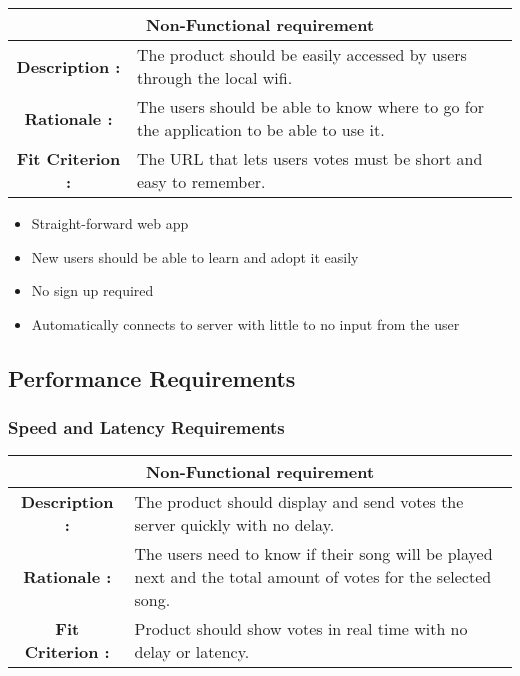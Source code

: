 \documentclass[12pt, titlepage]{article}
\begin{document}
\begin{center}
\begin{table}[H]
\begin{tabularx}{\textwidth}{| c X |}
\hline
\multicolumn{2}{|c|}{\textbf{Non-Functional requirement}}\\
\hline
\textbf{Description : } & The product should be easily accessed by users through the local wifi.\\
\hline
\textbf{Rationale : } & The users should be able to know where to go for the application to be able to use it.\\
\hline
\textbf{Fit Criterion : } & The URL that lets users votes must be short and easy to remember.\\
\hline
\end{tabularx}
\end{table}
\end{center}

\begin{itemize}
\item Straight-forward web app
\item New users should be able to learn and adopt it easily
\item No sign up required
\item Automatically connects to server with little to no input from the user
\end{itemize}

\subsection{Performance Requirements}
\subsubsection{Speed and Latency Requirements}

\begin{center}
\begin{table}[H]
\begin{tabularx}{\textwidth}{| c X |}
\hline
\multicolumn{2}{|c|}{\textbf{Non-Functional requirement}}\\
\hline
\textbf{Description : } &The product should display and send votes the server quickly with no delay.\\
\hline
\textbf{Rationale : } & The users need to know if their song will be played next and the total amount of votes for the selected song.\\
\hline
\textbf{Fit Criterion : } & Product should show votes in real time with no delay or latency.\\
\hline
\end{tabularx}
\end{table}
\end{center}
\end{document}
